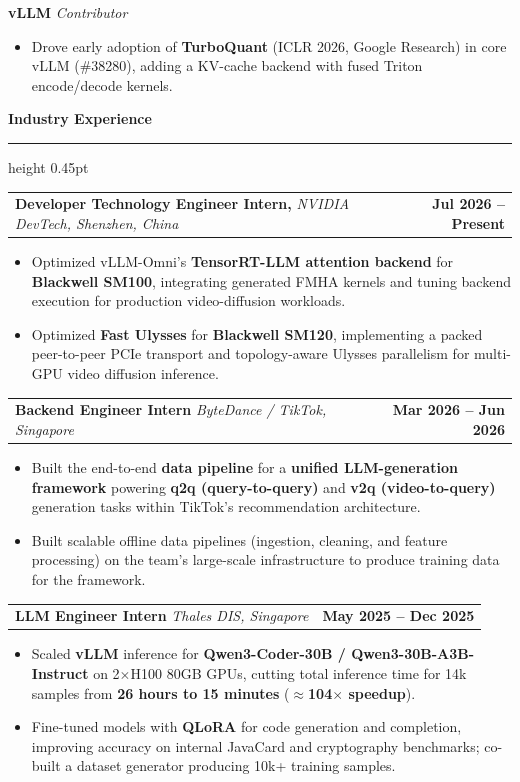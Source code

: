 \documentclass[10pt,letterpaper]{article}
\makeatletter
\newcommand{\cvsection}[1]{%
  \vspace{8pt}%
  {\fontsize{13.5pt}{15pt}\selectfont\bfseries #1}\par
  \vspace{1.5pt}\hrule height 0.45pt\vspace{3pt}%
}
\newcommand{\role}[3]{%
  {\fontsize{10pt}{11pt}\selectfont
  \begin{tabularx}{\textwidth}{@{}>{\raggedright\arraybackslash}Xr@{}}
    \textbf{#1} \textit{#2} & \textbf{#3}
  \end{tabularx}}\vspace{-1pt}%
}
\newcommand{\projectrole}[2]{%
  \textbf{#1} \textit{#2}\par\vspace{-1pt}%
}
\newenvironment{cvitems}{%
  \begin{itemize}[
    leftmargin=0.285in,
    labelsep=0.075in,
    itemsep=1.2pt,
    topsep=1.5pt,
    parsep=0pt,
    partopsep=0pt
  ]\raggedright
}{\end{itemize}}
\makeatother
\begin{document}
\projectrole{vLLM}{Contributor}
\begin{cvitems}
  \item Drove early adoption of \textbf{TurboQuant} (ICLR 2026, Google Research) in core vLLM (\#38280), adding a KV-cache backend with fused Triton encode/decode kernels.
\end{cvitems}

\cvsection{Industry Experience}
\role{Developer Technology Engineer Intern,}{NVIDIA DevTech, Shenzhen, China}{Jul 2026 -- Present}
\begin{cvitems}
  \item Optimized vLLM-Omni's \textbf{TensorRT-LLM attention backend} for \textbf{Blackwell SM100}, integrating generated FMHA kernels and tuning backend execution for production video-diffusion workloads.
  \item Optimized \textbf{Fast Ulysses} for \textbf{Blackwell SM120}, implementing a packed peer-to-peer PCIe transport and topology-aware Ulysses parallelism for multi-GPU video diffusion inference.
\end{cvitems}

\role{Backend Engineer Intern}{ByteDance / TikTok, Singapore}{Mar 2026 -- Jun 2026}
\begin{cvitems}
  \item Built the end-to-end \textbf{data pipeline} for a \textbf{unified LLM-generation framework} powering \textbf{q2q (query-to-query)} and \textbf{v2q (video-to-query)} generation tasks within TikTok's recommendation architecture.
  \item Built scalable offline data pipelines (ingestion, cleaning, and feature processing) on the team's large-scale infrastructure to produce training data for the framework.
\end{cvitems}

\role{LLM Engineer Intern}{Thales DIS, Singapore}{May 2025 -- Dec 2025}
\begin{cvitems}
  \item Scaled \textbf{vLLM} inference for \textbf{Qwen3-Coder-30B / Qwen3-30B-A3B-Instruct} on 2$\times$H100 80GB GPUs, cutting total inference time for 14k samples from \textbf{26 hours to 15 minutes} ($\approx$\textbf{104$\times$ speedup}).
  \item Fine-tuned models with \textbf{QLoRA} for code generation and completion, improving accuracy on internal JavaCard and cryptography benchmarks; co-built a dataset generator producing 10k+ training samples.
\end{cvitems}
\end{document}

